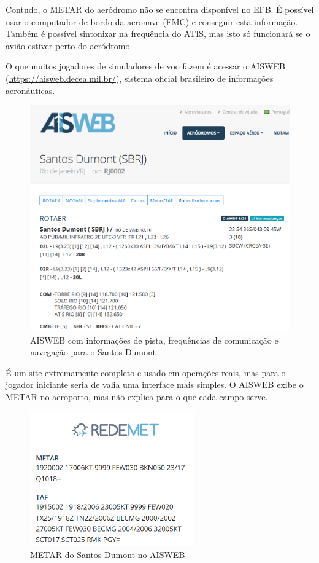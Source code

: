 Contudo, o METAR do aeródromo não se encontra disponível no EFB. É possível usar
 o computador de bordo da aeronave (FMC) e conseguir esta informação. Também é 
 possível sintonizar na frequência do ATIS, mas isto só funcionará se o avião
 estiver perto do aeródromo.

O que muitos jogadores de simuladores de voo fazem é acessar o AISWEB 
(\url{https://aisweb.decea.mil.br/}), sistema oficial brasileiro de informações
aeronáuticas. 

\begin{figure}[ht]
    \begin{center}
    \includegraphics[width=350pt]{img/aisweb.png}
    \caption{AISWEB com informações de pista, frequências de comunicação e navegação para o Santos Dumont}
    \label{fig:aisweb}
    \end{center}
\end{figure}

É um site extremamente completo e usado em operações reais, mas para o jogador 
iniciante seria de valia uma interface mais simples. O AISWEB exibe o METAR no 
aeroporto, mas não explica para o que cada campo serve.

\begin{figure}[ht]
    \begin{center}
    \includegraphics[width=200pt]{img/metar-aisweb.png}
    \caption{METAR do Santos Dumont no AISWEB}
    \label{fig:aisweb}
    \end{center}
\end{figure}


